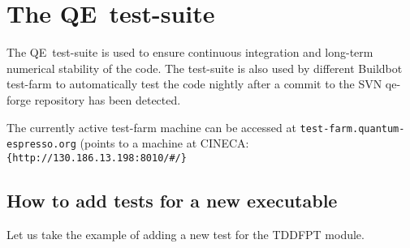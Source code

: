 \documentclass[12pt,a4paper]{article}
\def\qe{QE}
\begin{document}
\section{The \qe \, test-suite}
\label{Sec:testfarm}

The \qe\, test-suite is used to ensure continuous integration and long-term numerical stability of the code.
The test-suite is also used by different Buildbot test-farm to automatically test the code nightly after a commit to the SVN qe-forge repository has been detected. 

The currently active test-farm machine can be accessed at 
\texttt{test-farm.quantum-espresso.org} (points to a machine at CINECA:
\verb|{http://130.186.13.198:8010/#/}|

\subsection{How to add tests for a new executable}

Let us take the example of adding a new test for the TDDFPT module. 
\end{document}
